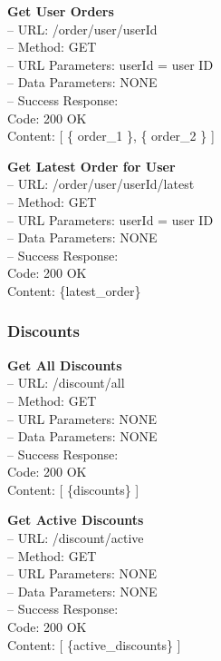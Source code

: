 \begin{flushleft} 
\textbf{Get User Orders} \\
– URL: /order/user/{userId} \\
– Method: GET \\
– URL Parameters: userId = user ID \\
– Data Parameters: NONE \\
– Success Response: \\
Code: 200 OK \\
Content: [ \{ order\_1 \}, \{ order\_2 \} ]
\end{flushleft}

\begin{flushleft} 
\textbf{Get Latest Order for User} \\
– URL: /order/user/{userId}/latest \\
– Method: GET \\
– URL Parameters: userId = user ID \\
– Data Parameters: NONE \\
– Success Response: \\
Code: 200 OK \\
Content: \{latest\_order\}
\end{flushleft}

\subsubsection*{Discounts}

\textbf{Get All Discounts} \\
– URL: /discount/all \\
– Method: GET \\
– URL Parameters: NONE \\
– Data Parameters: NONE \\
– Success Response: \\
Code: 200 OK \\
Content: [ \{discounts\} ]

\begin{flushleft} 
\textbf{Get Active Discounts} \\
– URL: /discount/active \\
– Method: GET \\
– URL Parameters: NONE \\
– Data Parameters: NONE \\
– Success Response: \\
Code: 200 OK \\
Content: [ \{active\_discounts\} ]
\end{flushleft}

